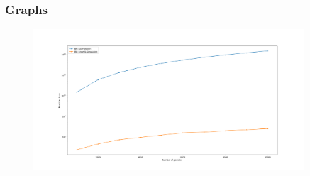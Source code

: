 \begin{frame}
    \frametitle{Graphs}
    \begin{figure}
        \label{fig:timelclog}
        \includegraphics[width=0.9\textwidth]{res/lj_big_plot_log}
    \end{figure}
\end{frame}
